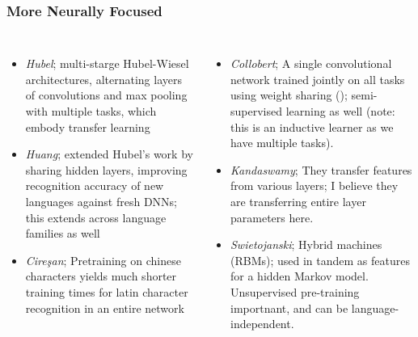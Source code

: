 \documentclass[t,handout]{beamer}
\begin{document}
\begin{frame}
\frametitle{More Neurally Focused}
\begin{columns}

\footnotesize{
\begin{itemize}
\item \textit{Hubel}; multi-starge Hubel-Wiesel architectures, alternating layers of convolutions and max pooling with multiple tasks, which embody transfer learning
\item \textit{Huang}; extended Hubel's work by sharing hidden layers, improving recognition accuracy of new languages against fresh DNNs; this extends across language families as well
\item \textit{Cire\c{s}an}; Pretraining on chinese characters yields much shorter training times for latin character recognition in an entire network
\end{itemize}
}

\footnotesize{
\begin{itemize}
\item \textit{Collobert}; A single convolutional network trained jointly on all tasks using weight sharing (); semi-supervised learning as well (note: this is an inductive learner as we have multiple tasks). 
\item \textit{Kandaswamy}; They transfer features from various layers; I believe they are transferring entire layer parameters here.
\item \textit{Swietojanski}; Hybrid machines (RBMs); used in tandem as features for a hidden Markov model. Unsupervised pre-training importnant, and can be language-independent.
\end{itemize}
}

\end{columns}
\end{frame}
\end{document}
